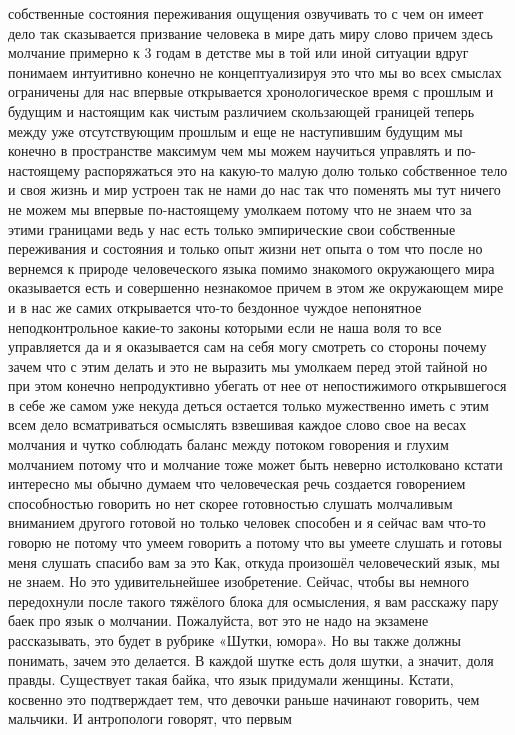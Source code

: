 собственные состояния переживания ощущения озвучивать то с чем он имеет дело так
сказывается призвание человека в мире дать миру слово причем здесь молчание
примерно к 3 годам в детстве мы в той или иной ситуации вдруг понимаем
интуитивно конечно не концептуализируя это что мы во всех смыслах ограничены для
нас впервые открывается хронологическое время с прошлым и будущим и настоящим
как чистым различием скользающей границей теперь между уже отсутствующим прошлым
и еще не наступившим будущим мы конечно в пространстве максимум чем мы можем
научиться управлять и по-настоящему распоряжаться это на какую-то малую долю
только собственное тело и своя жизнь и мир устроен так не нами до нас так что
поменять мы тут ничего не можем мы впервые по-настоящему умолкаем потому что не
знаем что за этими границами ведь у нас есть только эмпирические свои
собственные переживания и состояния и только опыт жизни нет опыта о том что
после но вернемся к природе человеческого языка помимо знакомого окружающего
мира оказывается есть и совершенно незнакомое причем в этом же окружающем мире и
в нас же самих открывается что-то бездонное чуждое непонятное неподконтрольное
какие-то законы которыми если не наша воля то все управляется да и я оказывается
сам на себя могу смотреть со стороны почему зачем что с этим делать и это не
выразить мы умолкаем перед этой тайной но при этом конечно непродуктивно убегать
от нее от непостижимого открывшегося в себе же самом уже некуда деться остается
только мужественно иметь с этим всем дело всматриваться осмыслять взвешивая
каждое слово свое на весах молчания и чутко соблюдать баланс между потоком
говорения и глухим молчанием потому что и молчание тоже может быть неверно
истолковано кстати интересно мы обычно думаем что человеческая речь создается
говорением способностью говорить но нет скорее готовностью слушать молчаливым
вниманием другого готовой но только человек способен и я сейчас вам что-то
говорю не потому что умеем говорить а потому что вы умеете слушать и готовы меня
слушать спасибо вам за это Как, откуда произошёл человеческий язык, мы не знаем.
Но это удивительнейшее изобретение. Сейчас, чтобы вы немного передохнули после
такого тяжёлого блока для осмысления, я вам расскажу пару баек про язык о
молчании. Пожалуйста, вот это не надо на экзамене рассказывать, это будет в
рубрике «Шутки, юмора». Но вы также должны понимать, зачем это делается. В
каждой шутке есть доля шутки, а значит, доля правды. Существует такая байка, что
язык придумали женщины. Кстати, косвенно это подтверждает тем, что девочки
раньше начинают говорить, чем мальчики. И антропологи говорят, что первым
